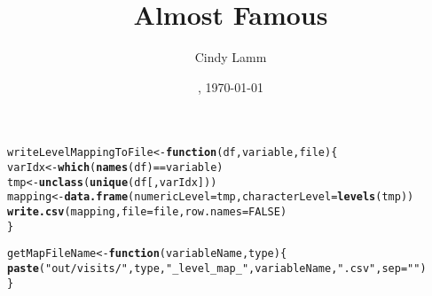 \documentclass{article}\usepackage[]{graphicx}\usepackage[]{color}
\makeatletter
\newcommand{\hlnum}[1]{\textcolor[rgb]{0.686,0.059,0.569}{#1}}%
\newcommand{\hlstr}[1]{\textcolor[rgb]{0.192,0.494,0.8}{#1}}%
\newcommand{\hlopt}[1]{\textcolor[rgb]{0,0,0}{#1}}%
\newcommand{\hlstd}[1]{\textcolor[rgb]{0.345,0.345,0.345}{#1}}%
\newcommand{\hlkwa}[1]{\textcolor[rgb]{0.161,0.373,0.58}{\textbf{#1}}}%
\newcommand{\hlkwb}[1]{\textcolor[rgb]{0.69,0.353,0.396}{#1}}%
\newcommand{\hlkwc}[1]{\textcolor[rgb]{0.333,0.667,0.333}{#1}}%
\newcommand{\hlkwd}[1]{\textcolor[rgb]{0.737,0.353,0.396}{\textbf{#1}}}%
\newenvironment{kframe}{%
 \def\at@end@of@kframe{}%
 \ifinner\ifhmode%
  \def\at@end@of@kframe{\end{minipage}}%
  \begin{minipage}{\columnwidth}%
 \fi\fi%
 \def\FrameCommand##1{\hskip\@totalleftmargin \hskip-\fboxsep
 \colorbox{shadecolor}{##1}\hskip-\fboxsep
     \hskip-\linewidth \hskip-\@totalleftmargin \hskip\columnwidth}%
 \MakeFramed {\advance\hsize-\width
   \@totalleftmargin\z@ \linewidth\hsize
   \@setminipage}}%
 {\par\unskip\endMakeFramed%
 \at@end@of@kframe}
\newenvironment{knitrout}{}{} %
\makeatother
\begin{document}
\flushbottom



\date{\currenttime, \today}
\title{Almost Famous}
\author{Cindy Lamm}

\maketitle













\begin{knitrout}
\color{fgcolor}\begin{kframe}
\begin{alltt}
\hlstd{writeLevelMappingToFile} \hlkwb{<-} \hlkwa{function}\hlstd{(}\hlkwc{df}\hlstd{,} \hlkwc{variable}\hlstd{,} \hlkwc{file}\hlstd{) \{}
  \hlstd{varIdx} \hlkwb{<-} \hlkwd{which}\hlstd{(}\hlkwd{names}\hlstd{(df)}\hlopt{==}\hlstd{variable)}
  \hlstd{tmp} \hlkwb{<-} \hlkwd{unclass}\hlstd{(}\hlkwd{unique}\hlstd{(df[,varIdx]))}
  \hlstd{mapping} \hlkwb{<-} \hlkwd{data.frame}\hlstd{(}\hlkwc{numericLevel}\hlstd{=tmp,} \hlkwc{characterLevel}\hlstd{=}\hlkwd{levels}\hlstd{(tmp))}
  \hlkwd{write.csv}\hlstd{(mapping,} \hlkwc{file}\hlstd{=file,} \hlkwc{row.names}\hlstd{=}\hlnum{FALSE}\hlstd{)}
\hlstd{\}}
\end{alltt}
\end{kframe}
\end{knitrout}

\begin{knitrout}
\color{fgcolor}\begin{kframe}
\begin{alltt}
\hlstd{getMapFileName} \hlkwb{<-} \hlkwa{function}\hlstd{(}\hlkwc{variableName}\hlstd{,} \hlkwc{type}\hlstd{) \{}
  \hlkwd{paste}\hlstd{(}\hlstr{"out/visits/"}\hlstd{,type,}\hlstr{"_level_map_"}\hlstd{,variableName,}\hlstr{".csv"}\hlstd{,} \hlkwc{sep}\hlstd{=}\hlstr{""}\hlstd{)}
\hlstd{\}}
\end{alltt}
\end{kframe}
\end{knitrout}

\end{document}
